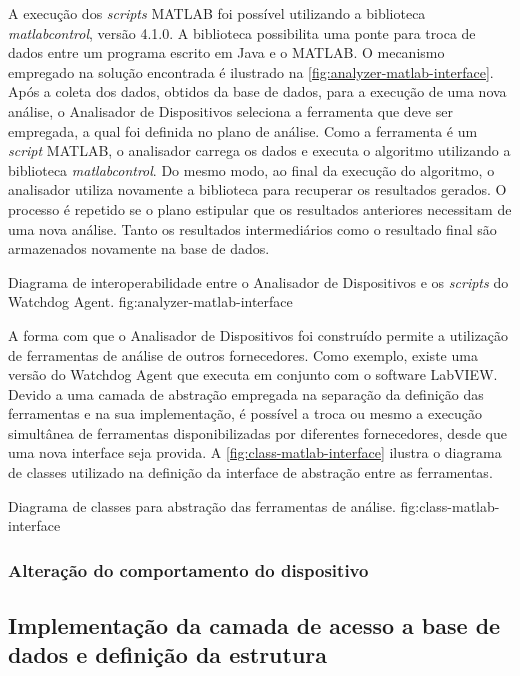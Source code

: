 A execução dos \textit{scripts} MATLAB foi possível utilizando a biblioteca
\emph{matlabcontrol}, versão 4.1.0. A biblioteca possibilita uma ponte para troca
de dados entre um programa escrito em Java e o MATLAB. O mecanismo empregado na solução encontrada é
ilustrado na \cref{fig:analyzer-matlab-interface}. Após a coleta dos dados, obtidos da base de
dados, para a execução de uma nova análise, o Analisador de Dispositivos seleciona a ferramenta que
deve ser empregada, a qual foi definida no plano de análise. Como a ferramenta é um \textit{script}
MATLAB, o analisador carrega os dados e executa o algoritmo utilizando a biblioteca
\emph{matlabcontrol}. Do mesmo modo, ao final da execução do algoritmo, o analisador utiliza
novamente a biblioteca para recuperar os resultados gerados. O processo é repetido se o plano
estipular que os resultados anteriores necessitam de uma nova análise. Tanto os resultados
intermediários como o resultado final são armazenados novamente na base de dados.

  {Diagrama de interoperabilidade entre o Analisador de Dispositivos e os \textit{scripts} do
      Watchdog Agent.}
  {fig:analyzer-matlab-interface}

A forma com que o Analisador de Dispositivos foi construído permite a utilização de ferramentas de
análise de outros fornecedores. Como exemplo, existe uma versão do Watchdog Agent que executa em
conjunto com o software LabVIEW. Devido a uma camada de abstração empregada na separação da
definição das ferramentas e na sua implementação, é possível a troca ou mesmo a execução simultânea
de ferramentas disponibilizadas por diferentes fornecedores, desde que uma nova interface seja
provida. A \cref{fig:class-matlab-interface} ilustra o diagrama de classes utilizado na definição da
interface de abstração entre as ferramentas.

  {Diagrama de classes para abstração das ferramentas de análise.}
  {fig:class-matlab-interface}


\subsubsection{Alteração do comportamento do dispositivo}


\subsection{Implementação da camada de acesso a base de dados e definição da estrutura}

